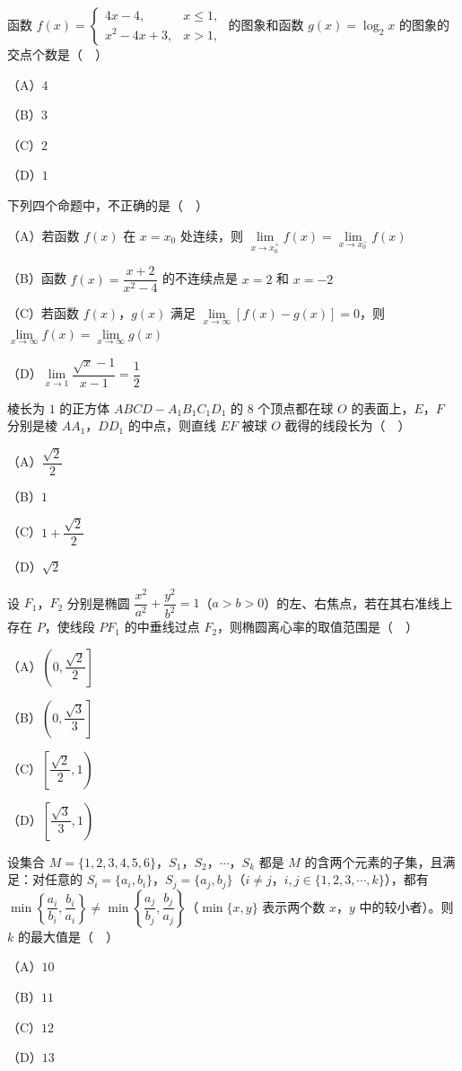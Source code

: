 \begin{question}
函数 $f(x)=\begin{cases}4x-4,&x\leqslant1,\\ x^2-4x+3,&x>1,\end{cases}$ 的图象和函数 $g(x)=\log_2x$ 的图象的交点个数是（　）

（A）$4$

（B）$3$

（C）$2$

（D）$1$

\end{question}
\begin{question}
下列四个命题中，不正确的是（　）

（A）若函数 $f(x)$ 在 $x=x_0$ 处连续，则 $\lim\limits_{x\to x_0^+}f(x)=\lim\limits_{x\to x_0^-}f(x)$

（B）函数 $f(x)=\dfrac{x+2}{x^2-4}$ 的不连续点是 $x=2$ 和 $x=-2$

（C）若函数 $f(x)$，$g(x)$ 满足 $\lim\limits_{x\to\infty}[f(x)-g(x)]=0$，则 $\lim\limits_{x\to\infty}f(x)=\lim\limits_{x\to\infty}g(x)$

（D）$\lim\limits_{x\to1}\dfrac{\sqrt x-1}{x-1}=\dfrac12$

\end{question}
\begin{question}
棱长为 $1$ 的正方体 $ABCD-A_1B_1C_1D_1$ 的 $8$ 个顶点都在球 $O$ 的表面上，$E$，$F$ 分别是棱 $AA_1$，$DD_1$ 的中点，则直线 $EF$ 被球 $O$ 截得的线段长为（　）

（A）$\dfrac{\sqrt2}2$

（B）$1$

（C）$1+\dfrac{\sqrt2}2$

（D）$\sqrt2$

\end{question}
\begin{question}
设 $F_1$，$F_2$ 分别是椭圆 $\dfrac{x^2}{a^2}+\dfrac{y^2}{b^2}=1$（$a>b>0$）的左、右焦点，若在其右准线上存在 $P$，使线段 $PF_1$ 的中垂线过点 $F_2$，则椭圆离心率的取值范围是（　）

（A）$\left(0,\dfrac{\sqrt2}2\right]$

（B）$\left(0,\dfrac{\sqrt3}3\right]$

（C）$\left[\dfrac{\sqrt2}2,1\right)$

（D）$\left[\dfrac{\sqrt3}3,1\right)$

\end{question}
\begin{question}
设集合 $M=\{1,2,3,4,5,6\}$，$S_1$，$S_2$，$\cdots$，$S_k$ 都是 $M$ 的含两个元素的子集，且满足：对任意的 $S_i=\{a_i,b_i\}$，$S_j=\{a_j,b_j\}$（$i\neq j$，$i,j\in\{1,2,3,\cdots,k\}$），都有 $\min\left\{\dfrac{a_i}{b_i},\dfrac{b_i}{a_i}\right\}\neq\min\left\{\dfrac{a_j}{b_j},\dfrac{b_j}{a_j}\right\}$（$\min\{x,y\}$ 表示两个数 $x$，$y$ 中的较小者）。则 $k$ 的最大值是（　）

（A）$10$

（B）$11$

（C）$12$

（D）$13$

\end{question}

